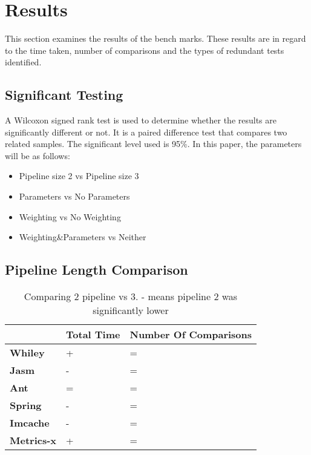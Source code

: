 \chapter{Results}\label{C:results}

This section examines the results of the bench marks. These results are in regard to the time taken, number of comparisons and the types of redundant tests identified.

\section{Significant Testing}

A Wilcoxon signed rank test is used to determine whether the results are significantly different or not. It is a paired difference test that compares two related samples. The significant level used is 95\%. In this paper, the parameters will be as follows:

\begin{itemize}
\item Pipeline size 2 vs Pipeline size 3
\item Parameters vs No Parameters
\item Weighting vs No Weighting
\item Weighting\&Parameters vs Neither
\end{itemize}


\section{Pipeline Length Comparison}

\begin{table}[]
\centering
\caption{Comparing 2 pipeline vs 3. - means pipeline 2 was significantly lower}
\label{my-label}
\begin{tabular}{|l|l|l|}
\hline
{\bf }          & {\bf Total Time} & {\bf Number Of Comparisons} \\ \hline
{\bf Whiley}    & +                & =                           \\ \hline
{\bf Jasm}      & -                & =                           \\ \hline
{\bf Ant}       & =                & =                           \\ \hline
{\bf Spring}    & -                & =                           \\ \hline
{\bf Imcache}   & -                & =                           \\ \hline
{\bf Metrics-x} & +                & =                           \\ \hline
\end{tabular}
\end{table}

